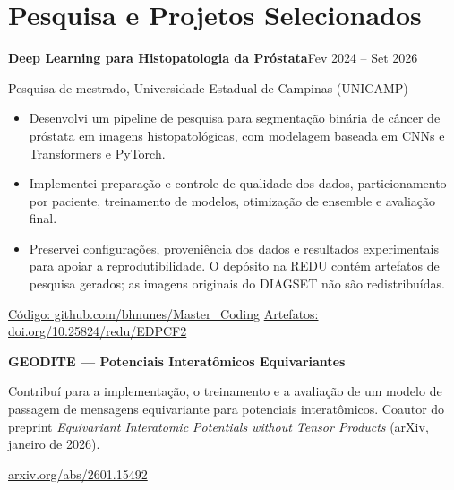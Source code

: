 \documentclass[10pt,a4paper]{article}
\begin{document}
\newpage
\section{Pesquisa e Projetos Selecionados}
\textbf{Deep Learning para Histopatologia da Próstata}\hfill {\small Fev 2024 -- Set 2026}\par
Pesquisa de mestrado, Universidade Estadual de Campinas (UNICAMP)\par
\begin{itemize}
  \item Desenvolvi um pipeline de pesquisa para segmentação binária de câncer de próstata em imagens histopatológicas, com modelagem baseada em CNNs e Transformers e PyTorch.
  \item Implementei preparação e controle de qualidade dos dados, particionamento por paciente, treinamento de modelos, otimização de ensemble e avaliação final.
  \item Preservei configurações, proveniência dos dados e resultados experimentais para apoiar a reprodutibilidade. O depósito na REDU contém artefatos de pesquisa gerados; as imagens originais do DIAGSET não são redistribuídas.
\end{itemize}
{\small \href{https://github.com/bhnunes/Master_Coding}{Código: github.com/bhnunes/Master\_Coding}\quad\textbar\quad
\href{https://doi.org/10.25824/redu/EDPCF2}{Artefatos: doi.org/10.25824/redu/EDPCF2}}\par
\vspace{2pt}
\textbf{GEODITE --- Potenciais Interatômicos Equivariantes}\par
Contribuí para a implementação, o treinamento e a avaliação de um modelo de passagem de mensagens equivariante para potenciais interatômicos. Coautor do preprint \emph{Equivariant Interatomic Potentials without Tensor Products} (arXiv, janeiro de 2026).\par
{\small \href{https://arxiv.org/abs/2601.15492}{arxiv.org/abs/2601.15492}}\par
\end{document}
